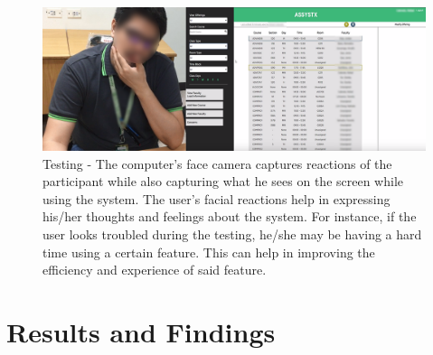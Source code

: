 \begin{figure}[]
\centering
   \includegraphics[scale=1.5,keepaspectratio]{PCSC2019_latex/Tests/sirTighe.png}
   \caption{Testing - The computer's face camera captures reactions of the participant while also capturing what he sees on the screen while using the system. The user's facial reactions help in expressing his/her thoughts and feelings about the system. For instance, if the user looks troubled during the testing, he/she may be having a hard time using a certain feature. This can help in improving the efficiency and experience of said feature. }
    \label{fig:cvc_testing}
\end{figure}

\section{Results and Findings}
